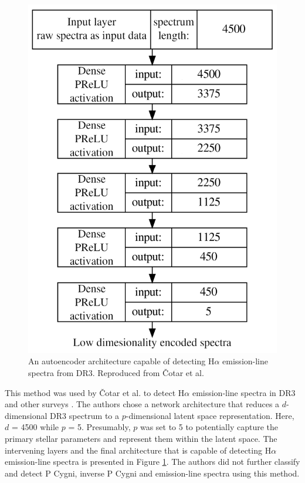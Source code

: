 \begin{figure}[!htb]
\centering
\includegraphics[scale=0.45]{figures/autoencoder.png}
\caption{An autoencoder architecture capable of detecting H$\alpha$ emission-line spectra from DR3. Reproduced from Čotar et al.}
\label{fig2.7}
\end{figure}

This method was used by Čotar et al. to detect H$\alpha$ emission-line spectra in DR3 and other surveys \citep{vcotar2021galah}. The authors chose a network architecture that reduces a $d$-dimensional DR3 spectrum to a $p$-dimensional latent space representation. Here, $d$ = 4500 while $p$ = 5. Presumably, $p$ was set to 5 to potentially capture the primary stellar parameters and represent them within the latent space. The intervening layers and the final architecture that is capable of detecting H$\alpha$ emission-line spectra is presented in Figure \ref{fig2.7}. The authors did not further classify and detect P Cygni, inverse P Cygni and emission-line spectra using this method. 

